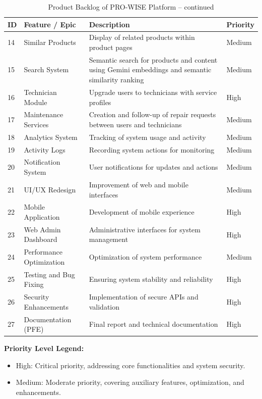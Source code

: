 \documentclass[12pt,a4paper]{report}
\begin{document}
\begin{table}[H]
\centering
\small
\caption{Product Backlog of PRO-WISE Platform -- continued}
\begin{tabular}{p{0.7cm}p{3.1cm}p{8.1cm}p{1.4cm}}
\toprule
\textbf{ID} & \textbf{Feature / Epic} & \textbf{Description} & \textbf{Priority} \\
\midrule
14 & Similar Products & Display of related products within product pages & Medium \\
15 & Search System & Semantic search for products and content using Gemini embeddings and semantic similarity ranking & Medium \\
16 & Technician Module & Upgrade users to technicians with service profiles & High \\
17 & Maintenance Services & Creation and follow-up of repair requests between users and technicians & Medium \\
18 & Analytics System & Tracking of system usage and activity & Medium \\
19 & Activity Logs & Recording system actions for monitoring & Medium \\
20 & Notification System & User notifications for updates and actions & Medium \\
21 & UI/UX Redesign & Improvement of web and mobile interfaces & Medium \\
22 & Mobile Application & Development of mobile experience & High \\
23 & Web Admin Dashboard & Administrative interfaces for system management & High \\
24 & Performance Optimization & Optimization of system performance & Medium \\
25 & Testing and Bug Fixing & Ensuring system stability and reliability & High \\
26 & Security Enhancements & Implementation of secure APIs and validation & High \\
27 & Documentation (PFE) & Final report and technical documentation & High \\
\bottomrule
\end{tabular}
\end{table}

\textbf{Priority Level Legend:}
\begin{itemize}
    \item High: Critical priority, addressing core functionalities and system security.
    \item Medium: Moderate priority, covering auxiliary features, optimization, and enhancements.
\end{itemize}
\end{document}
